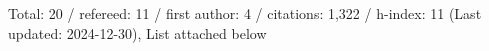 Total: 20 / refereed: 11 / first author: 4 / citations: 1,322 / h-index: 11 (Last updated: 2024-12-30), List attached below